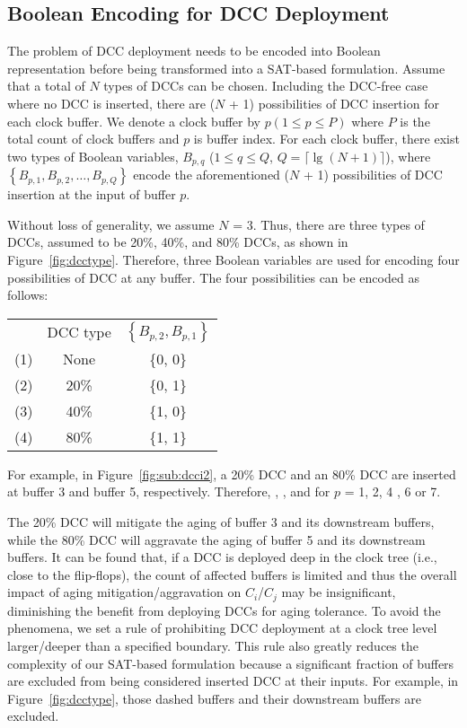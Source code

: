 \subsection{Boolean Encoding for DCC Deployment}
\label{subsec:eddcd}
The problem of DCC deployment needs to be encoded into Boolean representation before being transformed into a SAT-based formulation. Assume that a total of $N$ types of DCCs can be chosen. Including the DCC-free case where no DCC is inserted, there are ($N$ + 1) possibilities of DCC insertion for each clock buffer. We denote a clock buffer by $p\left(1 \leq p \leq P\right)$ where $P$ is the total count of clock buffers and $p$ is buffer index. For each clock buffer, there exist two types of Boolean variables, {\fontsize{9}{10}$B_{p,q}$} ($1 \leq q \leq Q $, $Q = \lceil \lg (N + 1)\rceil$), where {\fontsize{9}{10}$\left\{B_{p,1}, B_{p,2},\dotsc, B_{p,Q}\right\}$} encode the aforementioned ($N$ + 1) possibilities of DCC insertion at the input of buffer $p$.

Without loss of generality, we assume $N$ = 3. Thus, there are three types of DCCs, assumed to be 20\%, 40\%, and 80\% DCCs, as shown in Figure~\ref{fig:dcctype}. Therefore, three Boolean variables are used for encoding four possibilities of DCC at any buffer. The four possibilities can be encoded as follows:

{\small
\begin{tabular}{ c c c }
\centering
   & DCC type & $\left\{B_{p,2},B_{p,1}\right\}$ \\
  (1)\quad & None & \{0, 0\} \\
  (2)\quad & 20\% &  \{0, 1\} \\
  (3)\quad & 40\% &  \{1, 0\} \\
  (4)\quad & 80\% &  \{1, 1\} \\
\end{tabular}}



For example, in Figure~\ref{fig:sub:dcci2}, a 20\% DCC and an 80\% DCC are inserted at buffer 3 and buffer 5, respectively. Therefore, {}, {}, and {} for $p$ = 1, 2, 4 , 6 or 7.

The 20\% DCC will mitigate the aging of buffer 3 and its downstream buffers, while the 80\% DCC will aggravate the aging of buffer 5 and its downstream buffers. It can be found that, if a DCC is deployed deep in the clock tree (i.e., close to the flip-flops), the count of affected buffers is limited and thus the overall impact of aging mitigation/aggravation on $C_i$/$C_j$ may be insignificant, diminishing the benefit from deploying DCCs for aging tolerance.  To avoid the phenomena, we set a rule of prohibiting DCC deployment at a clock tree level larger/deeper than a specified boundary. This rule also greatly reduces the complexity of our SAT-based formulation because a significant fraction of buffers are excluded from being considered inserted DCC at their inputs. For example, in Figure~\ref{fig:dcctype}, those dashed buffers and their downstream buffers are excluded. 

